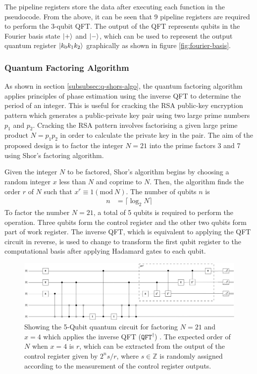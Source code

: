 The pipeline registers store the data after executing each function in the pseudocode. From the above, it can be seen that 9 pipeline registers are required to perform the 3-qubit QFT. The output of the QFT represents qubits in the Fourier basis state $\ket{+}$ and $\ket{-}$, which can be used to represent the output quantum register $\ket{k_0 k_1 k_2}$ graphically as shown in figure \ref{fig:fourier-basis}. 

\subsubsection{Quantum Factoring Algorithm}

As shown in section \ref{subsubsec:q-shors-algo}, the quantum factoring algorithm applies principles of phase estimation using the inverse QFT to determine the period of an integer. This is useful for cracking the RSA public-key encryption pattern which generates a public-private key pair using two large prime numbers $p_1$ and $p_2$. Cracking the RSA pattern involves factorising a given large prime product $N = p_1 p_2$ in order to calculate the private key in the pair. The aim of the proposed design is to factor the integer $N = 21$ into the prime factors 3 and 7 using Shor's factoring algorithm. 

Given the integer $N$ to be factored, Shor's algorithm begins by choosing a random integer $x$ less than $N$ and coprime to $N$. Then, the algorithm finds the order $r$ of $N$ such that $x^r \equiv1\left(\text{mod}~N\right)$. The number of qubits $n$ is 
\begin{align}\label{eqn:shor-required-bits}
	n	& = \lceil \log_2 N\rceil
\end{align}
To factor the number $N = 21$, a total of 5 qubits is required to perform the operation. Three qubits form the control register and the other two qubits form part of work register. The inverse QFT, which is equivalent to applying the QFT circuit in reverse, is used to change to transform the first qubit register to the computational basis after applying Hadamard gates to each qubit.
\begin{figure}[!ht]
	\centering
	\includegraphics[width=1.0\linewidth]{body/ch4/figs/quantum-factoring-algorithm}
	\caption[Quantum Circuit Representation of the Emulated Quantum Factoring Algorithm for $N = 21$ and $a=4$.]{Showing the 5-Qubit quantum circuit for factoring $N=21$ and $x=4$  which applies the inverse QFT ($\texttt{QFT}^\dagger$) \cite{skosana2021demonstration}. The expected order of $N$ when $x = 4$ is $r$, which can be extracted from the output of the control register given by $2^n s/r$, where $s \in \mathbb{Z}$ is randomly assigned according to the measurement of the control register outputs.}
	\label{fig:quantum-factoring-algorithm}
\end{figure}

